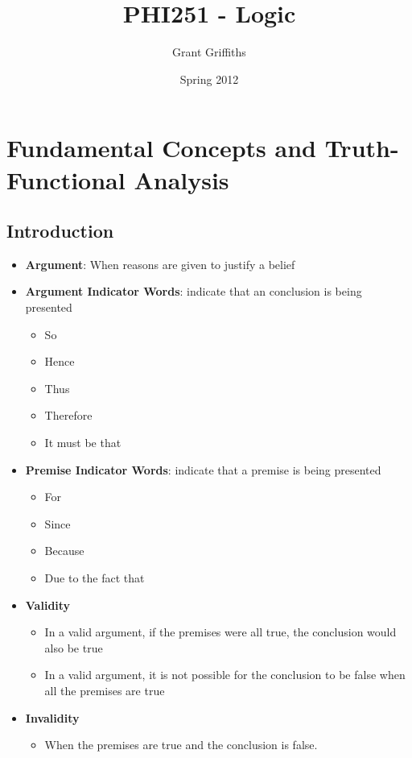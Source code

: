 \documentclass{report}
\title{PHI251 - Logic}
\author{Grant Griffiths}
\date{Spring 2012}
\begin{document}
   \maketitle
   \tableofcontents


\chapter{Fundamental Concepts and Truth-Functional Analysis}
	\section{Introduction}
		\begin{itemize}\addtolength{\leftskip}{2em}
			\item \textbf{Argument}: When reasons are given to justify a belief
			\item\textbf{ Argument Indicator Words}: indicate that an conclusion is being presented
			\begin{itemize}\addtolength{\leftskip}{4em}
				\item So 
				\item Hence
				\item Thus 
				\item Therefore
				\item It must be that
			\end{itemize}
			\item\textbf{Premise Indicator Words}: indicate that a premise is being presented
			\begin{itemize}\addtolength{\leftskip}{4em}
				\item For 
				\item Since
				\item Because
				\item Due to the fact that
			\end{itemize}
			\item \textbf{Validity}
			\begin{itemize}\addtolength{\leftskip}{4em}
				\item In a valid argument, if the premises were all true,  the conclusion would also be true
				\item In a valid argument, it is not possible for the conclusion to be false when all the premises are true
			\end{itemize}
			\item \textbf{Invalidity}
			\begin{itemize}\addtolength{\leftskip}{4em}
				\item When the premises are true and the conclusion is false. 

\end{itemize}
\end{itemize}
\end{document}
